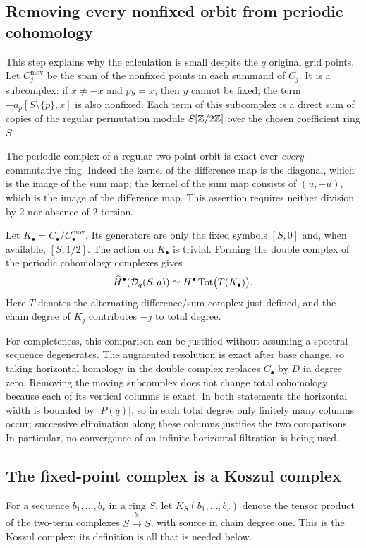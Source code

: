 \subsection{Removing every nonfixed orbit from periodic cohomology}
This step explains why the calculation is small despite the $q$
original grid points. Let $C^{\mathrm{mov}}_j$ be the span of the
nonfixed points in each summand of $C_j$. It is a subcomplex:
if $x\ne-x$ and $py=x$, then $y$ cannot be fixed; the term
$-a_p[S\setminus\{p\},x]$ is also nonfixed. Each term of this
subcomplex is a direct sum of copies of the regular permutation
module $S[\mathbb Z/2\mathbb Z]$ over the chosen coefficient ring $S$.

The periodic complex of a regular two-point orbit is exact over
\emph{every} commutative ring. Indeed the kernel of the difference
map is the diagonal, which is the image of the sum map; the kernel
of the sum map consists of $(u,-u)$, which is the image of the
difference map. This assertion requires neither division by $2$
nor absence of $2$-torsion.

Let $K_\bullet=C_\bullet/C^{\mathrm{mov}}_\bullet$. Its generators
are only the fixed symbols $[S,0]$ and, when available, $[S,1/2]$.
The action on $K_\bullet$ is trivial. Forming the double complex of
the periodic cohomology complexes gives
\begin{equation}\label{ir:eq:tate-comparison}
 \widehat H^\bullet(\mathcal D_q(S,a))\simeq
 H^\bullet\operatorname{Tot}\bigl(T(K_\bullet)\bigr).
\end{equation}
Here $T$ denotes the alternating difference/sum complex just defined,
and the chain degree of $K_j$ contributes $-j$ to total degree.

For completeness, this comparison can be justified without assuming a
spectral sequence degenerates. The augmented resolution is exact after
base change, so taking horizontal homology in the double complex
replaces $C_\bullet$ by $D$ in degree zero. Removing the moving
subcomplex does not change total cohomology because each of its
vertical columns is exact. In both statements the horizontal width
is bounded by $|P(q)|$, so in each total degree only finitely many
columns occur; successive elimination along these columns justifies
the two comparisons. In particular, no convergence of an infinite
horizontal filtration is being used.

\subsection{The fixed-point complex is a Koszul complex}
For a sequence $b_1,\ldots,b_r$ in a ring $S$, let
$K_S(b_1,\ldots,b_r)$ denote the tensor product of the two-term
complexes $S\xrightarrow{b_i}S$, with source in chain degree one.
This is the Koszul complex; its definition is all that is needed below.

